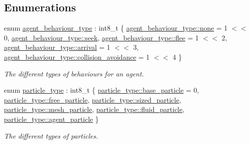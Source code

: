 \subsection*{Enumerations}
\begin{DoxyCompactItemize}
\item 
enum \hyperlink{namespacephysim_1_1particles_a033757595f7862a0fc8a389d79bf9c88}{agent\+\_\+behaviour\+\_\+type} \+: int8\+\_\+t \{ \newline
\hyperlink{namespacephysim_1_1particles_a033757595f7862a0fc8a389d79bf9c88a334c4a4c42fdb79d7ebc3e73b517e6f8}{agent\+\_\+behaviour\+\_\+type\+::none} = 1 $<$$<$ 0, 
\hyperlink{namespacephysim_1_1particles_a033757595f7862a0fc8a389d79bf9c88ae6f6362248805a36c61d205dbc6f4076}{agent\+\_\+behaviour\+\_\+type\+::seek}, 
\hyperlink{namespacephysim_1_1particles_a033757595f7862a0fc8a389d79bf9c88a918634f9410d3be95b2c6074f18cc62b}{agent\+\_\+behaviour\+\_\+type\+::flee} = 1 $<$$<$ 2, 
\hyperlink{namespacephysim_1_1particles_a033757595f7862a0fc8a389d79bf9c88a0d4144ffc7e8e66a72800ea2b4101fd0}{agent\+\_\+behaviour\+\_\+type\+::arrival} = 1 $<$$<$ 3, 
\newline
\hyperlink{namespacephysim_1_1particles_a033757595f7862a0fc8a389d79bf9c88aa150bf2057adbf0518b8bd2a4019d5a4}{agent\+\_\+behaviour\+\_\+type\+::collision\+\_\+avoidance} = 1 $<$$<$ 4
 \}\begin{DoxyCompactList}\small\item\em The different types of behaviours for an agent. \end{DoxyCompactList}
\item 
enum \hyperlink{namespacephysim_1_1particles_a068e6cda6626fbd381c07a9835425b08}{particle\+\_\+type} \+: int8\+\_\+t \{ \newline
\hyperlink{namespacephysim_1_1particles_a068e6cda6626fbd381c07a9835425b08ab475beb2641566c6d36adda0024a1ba1}{particle\+\_\+type\+::base\+\_\+particle} = 0, 
\hyperlink{namespacephysim_1_1particles_a068e6cda6626fbd381c07a9835425b08a6c30f0004aaf69e5cf185346e8f322d8}{particle\+\_\+type\+::free\+\_\+particle}, 
\hyperlink{namespacephysim_1_1particles_a068e6cda6626fbd381c07a9835425b08aba7a75b3240c0e68fe64be562e4f6f81}{particle\+\_\+type\+::sized\+\_\+particle}, 
\hyperlink{namespacephysim_1_1particles_a068e6cda6626fbd381c07a9835425b08a6dcdddb3b81f6e4419f4b2883f11ac46}{particle\+\_\+type\+::mesh\+\_\+particle}, 
\newline
\hyperlink{namespacephysim_1_1particles_a068e6cda6626fbd381c07a9835425b08acd1fa3faece552fbe658256d4d05d2a6}{particle\+\_\+type\+::fluid\+\_\+particle}, 
\hyperlink{namespacephysim_1_1particles_a068e6cda6626fbd381c07a9835425b08a8f5a9a8c6aed38c79edad63bfc681c2c}{particle\+\_\+type\+::agent\+\_\+particle}
 \}\begin{DoxyCompactList}\small\item\em The different types of particles. \end{DoxyCompactList}
\end{DoxyCompactItemize}
